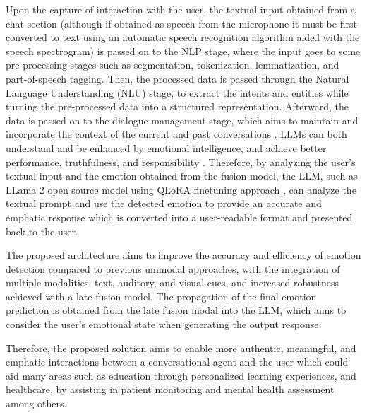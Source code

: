 \documentclass[runningheads]{llncs}
\begin{document}

Upon the capture of interaction with the user, the textual input obtained from a chat section (although if obtained as speech from the microphone it must be first converted to text using an automatic speech recognition algorithm aided with the speech spectrogram) is passed on to the NLP stage, where the input goes to some pre-processing stages such as segmentation, tokenization, lemmatization, and part-of-speech tagging. Then, the processed data is passed through the Natural Language Understanding (NLU) stage, to extract the intents and entities while turning the pre-processed data into a structured representation. Afterward, the data is passed on to the dialogue management stage, which aims to maintain and incorporate the context of the current and past conversations \cite{rizou_multilingual_2022}. LLMs can both understand and be enhanced by emotional intelligence, and achieve better performance, truthfulness, and responsibility \cite{li_large_2023}. Therefore, by analyzing the user's textual input and the emotion obtained from the fusion model, the LLM, such as LLama 2 open source model using QLoRA finetuning approach \cite{Dettmers2023}, can analyze the textual prompt and use the detected emotion to provide an accurate and emphatic response which is converted into a user-readable format and presented back to the user.

The proposed architecture aims to improve the accuracy and efficiency of emotion detection compared to previous unimodal approaches, with the integration of multiple modalities: text, auditory, and visual cues, and increased robustness achieved with a late fusion model. The propagation of the final emotion prediction is obtained from the late fusion modal into the LLM, which aims to consider the user's emotional state when generating the output response.

Therefore, the proposed solution aims to enable more authentic, meaningful, and emphatic interactions between a conversational agent and the user which could aid many areas such as education through personalized learning experiences, and healthcare, by assisting in patient monitoring and mental health assessment among others.

\end{document}
